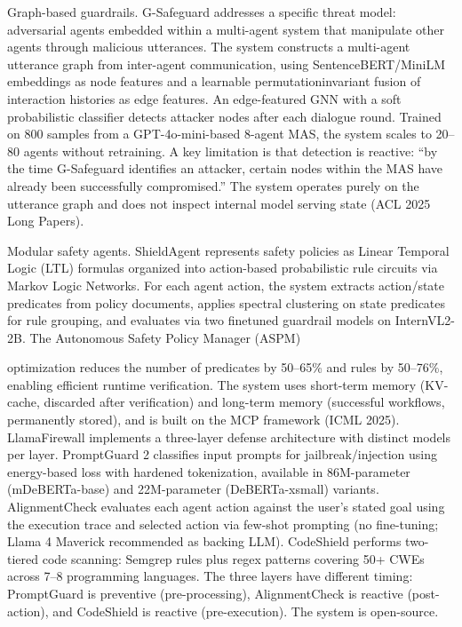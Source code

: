 \documentclass[preprint,12pt]{elsarticle}
\begin{document}
Graph-based guardrails. G-Safeguard \cite{v5ref37} addresses a specific threat model: adversarial agents embedded within a multi-agent system that manipulate other agents through malicious utterances. The system constructs a multi-agent utterance graph from inter-agent communication, using SentenceBERT/MiniLM embeddings as node features and a learnable permutationinvariant fusion of interaction histories as edge features. An edge-featured GNN with a soft probabilistic classifier detects attacker nodes after each dialogue round. Trained on 800 samples from a GPT-4o-mini-based 8-agent MAS, the system scales to 20--80 agents without retraining. A key limitation is that detection is reactive: ``by the time G-Safeguard identifies an attacker, certain nodes within the MAS have already been successfully compromised.'' The system operates purely on the utterance graph and does not inspect internal model serving state (ACL 2025 Long Papers).


Modular safety agents. ShieldAgent \cite{v5ref8} represents safety policies as Linear Temporal Logic (LTL) formulas organized into action-based probabilistic rule circuits via Markov Logic Networks. For each agent action, the system extracts action/state predicates from policy documents, applies spectral clustering on state predicates for rule grouping, and evaluates via two finetuned guardrail models on InternVL2-2B. The Autonomous Safety Policy Manager (ASPM)


optimization reduces the number of predicates by 50--65\% and rules by 50--76\%, enabling efficient runtime verification. The system uses short-term memory (KV-cache, discarded after verification) and long-term memory (successful workflows, permanently stored), and is built on the MCP framework (ICML 2025). LlamaFirewall \cite{v5ref9} implements a three-layer defense architecture with distinct models per layer. PromptGuard 2 classifies input prompts for jailbreak/injection using energy-based loss with hardened tokenization, available in 86M-parameter (mDeBERTa-base) and 22M-parameter (DeBERTa-xsmall) variants. AlignmentCheck evaluates each agent action against the user's stated goal using the execution trace and selected action via few-shot prompting (no fine-tuning; Llama 4 Maverick recommended as backing LLM). CodeShield performs two-tiered code scanning: Semgrep rules plus regex patterns covering 50+ CWEs across 7--8 programming languages. The three layers have different timing: PromptGuard is preventive (pre-processing), AlignmentCheck is reactive (post-action), and CodeShield is reactive (pre-execution). The system is open-source.
\end{document}
